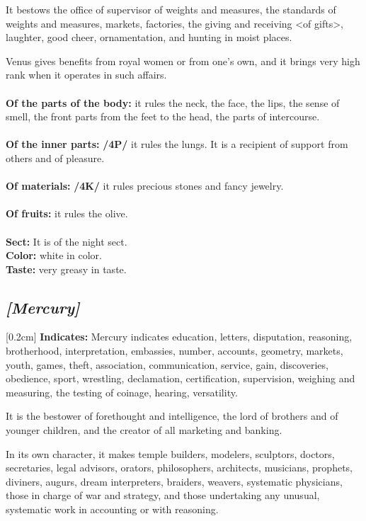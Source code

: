 It bestows the office of supervisor of weights and measures, the standards of weights and measures, markets, factories, the giving and receiving <of gifts>, laughter, good cheer, ornamentation, and hunting in moist places.

Venus gives benefits from royal women or from one’s own, and it brings very high rank when it operates in such affairs. \\
\\
\textbf{Of the parts of the body:} it rules the neck, the face, the lips, the sense of smell, the front parts from the feet to the head, the parts of intercourse. \\
\\
\textbf{Of the inner parts:} \textbf{/4P/} it rules the lungs. It is a recipient of support from others and of pleasure.\\ 
\\
\textbf{Of materials:} \textbf{/4K/} it rules precious
stones and fancy jewelry. \\
\\ 
\textbf{Of fruits:} it rules the olive. \\
\\
\textbf{Sect:} It is of the night sect.\\
\textbf{Color:} white in color. \\
\textbf{Taste:} very greasy in taste.

\secbr
\subsection{\textit{[Mercury]}}
[0.2cm]
\noindent
\textbf{Indicates:}  Mercury indicates education, letters, disputation, reasoning, brotherhood, interpretation, embassies, number, accounts, geometry, markets, youth, games, theft, association, communication, service, gain, discoveries, obedience, sport, wrestling, declamation, certification, supervision, weighing and measuring, the testing of coinage, hearing, versatility. 

It is the bestower of forethought and intelligence, the lord of brothers and of younger children, and the creator of all marketing and banking. 

In its own character, it makes temple builders, modelers, sculptors, doctors, secretaries, legal advisors, orators, philosophers, architects, musicians, prophets, diviners, augurs, dream interpreters, braiders, weavers, systematic physicians, those in charge of war and strategy, and those undertaking any unusual, systematic work in accounting or with reasoning. 

